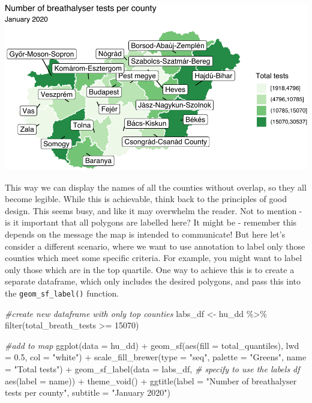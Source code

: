 \documentclass[
]{book}
\newenvironment{Shaded}{\begin{snugshade}}{\end{snugshade}}
\newcommand{\AttributeTok}[1]{\textcolor[rgb]{0.77,0.63,0.00}{#1}}
\newcommand{\CommentTok}[1]{\textcolor[rgb]{0.56,0.35,0.01}{\textit{#1}}}
\newcommand{\DecValTok}[1]{\textcolor[rgb]{0.00,0.00,0.81}{#1}}
\newcommand{\FloatTok}[1]{\textcolor[rgb]{0.00,0.00,0.81}{#1}}
\newcommand{\FunctionTok}[1]{\textcolor[rgb]{0.00,0.00,0.00}{#1}}
\newcommand{\NormalTok}[1]{#1}
\newcommand{\OtherTok}[1]{\textcolor[rgb]{0.56,0.35,0.01}{#1}}
\newcommand{\SpecialCharTok}[1]{\textcolor[rgb]{0.00,0.00,0.00}{#1}}
\newcommand{\StringTok}[1]{\textcolor[rgb]{0.31,0.60,0.02}{#1}}
\begin{document}
\includegraphics{crime_mapping_files/figure-latex/unnamed-chunk-160-1.pdf}

This way we can display the names of all the counties without overlap, so they all become legible. While this is achievable, think back to the principles of good design. This seems busy, and like it may overwhelm the reader. Not to mention - is it important that all polygons are labelled here? It might be - remember this depends on the message the map is intended to communicate! But here let's consider a different scenario, where we want to use annotation to label only those counties which meet some specific criteria. For example, you might want to label only those which are in the top quartile. One way to achieve this is to create a separate dataframe, which only includes the desired polygons, and pass this into the \texttt{geom\_sf\_label()} function.

\begin{Shaded}
\begin{Highlighting}[]
\CommentTok{\#create new dataframe with only top counties}
\NormalTok{labs\_df }\OtherTok{\textless{}{-}}\NormalTok{ hu\_dd }\SpecialCharTok{\%\textgreater{}\%} \FunctionTok{filter}\NormalTok{(total\_breath\_tests }\SpecialCharTok{\textgreater{}=} \DecValTok{15070}\NormalTok{)}

\CommentTok{\#add to map}
\FunctionTok{ggplot}\NormalTok{(}\AttributeTok{data =}\NormalTok{ hu\_dd) }\SpecialCharTok{+} 
  \FunctionTok{geom\_sf}\NormalTok{(}\FunctionTok{aes}\NormalTok{(}\AttributeTok{fill =}\NormalTok{ total\_quantiles), }
          \AttributeTok{lwd =} \FloatTok{0.5}\NormalTok{, }\AttributeTok{col =} \StringTok{"white"}\NormalTok{) }\SpecialCharTok{+} 
  \FunctionTok{scale\_fill\_brewer}\NormalTok{(}\AttributeTok{type =} \StringTok{"seq"}\NormalTok{, }
                    \AttributeTok{palette =} \StringTok{"Greens"}\NormalTok{, }
                    \AttributeTok{name =} \StringTok{"Total tests"}\NormalTok{) }\SpecialCharTok{+} 
  \FunctionTok{geom\_sf\_label}\NormalTok{(}\AttributeTok{data =}\NormalTok{ labs\_df, }\CommentTok{\# specify to use the labels df}
                \FunctionTok{aes}\NormalTok{(}\AttributeTok{label =}\NormalTok{ name)) }\SpecialCharTok{+} 
  \FunctionTok{theme\_void}\NormalTok{() }\SpecialCharTok{+} 
  \FunctionTok{ggtitle}\NormalTok{(}\AttributeTok{label =} \StringTok{"Number of breathalyser tests per county"}\NormalTok{, }
          \AttributeTok{subtitle =} \StringTok{"January 2020"}\NormalTok{)}
\end{Highlighting}
\end{Shaded}
\end{document}
